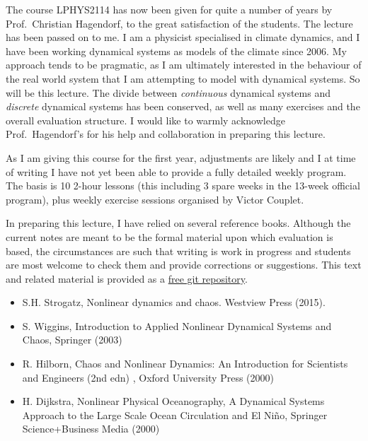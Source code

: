 The course LPHYS2114 has now been given for quite a number of years by
Prof.~Christian Hagendorf, to the great satisfaction of the students.
The lecture has been passed on to me. I am a physicist specialised in
climate dynamics, and I have been working dynamical systems as models of
the climate since 2006. My approach tends to be pragmatic, as I am
ultimately interested in the behaviour of the real world system that I
am attempting to model with dynamical systems. So will be this lecture.
The divide between \emph{continuous} dynamical systems and
\emph{discrete} dynamical systems has been conserved, as well as many
exercises and the overall evaluation structure. I would like to warmly
acknowledge Prof.~Hagendorf's for his help and collaboration in
preparing this lecture.

As I am giving this course for the first year, adjustments are likely
and I at time of writing I have not yet been able to provide a fully
detailed weekly program. The basis is 10 2-hour lessons (this including
3 spare weeks in the 13-week official program), plus weekly exercise
sessions organised by Victor Couplet.

In preparing this lecture, I have relied on several reference books.
Although the current notes are meant to be the formal material upon
which evaluation is based, the circumstances are such that writing is
work in progress and students are most welcome to check them and provide
corrections or suggestions. This text and related material is provided
as a \href{https://github.com/mcrucifix/LPHYS2114}{free git repository}.

\begin{itemize}
\tightlist
\item
  S.H. Strogatz, Nonlinear dynamics and chaos. Westview Press (2015).
\item
  S. Wiggins, Introduction to Applied Nonlinear Dynamical Systems and
  Chaos, Springer (2003)
\item
  R. Hilborn, Chaos and Nonlinear Dynamics: An Introduction for
  Scientists and Engineers (2nd edn) , Oxford University Press (2000)
\item
  H. Dijkstra, Nonlinear Physical Oceanography, A Dynamical Systems
  Approach to the Large Scale Ocean Circulation and El Niño, Springer
  Science+Business Media (2000)
\end{itemize}

